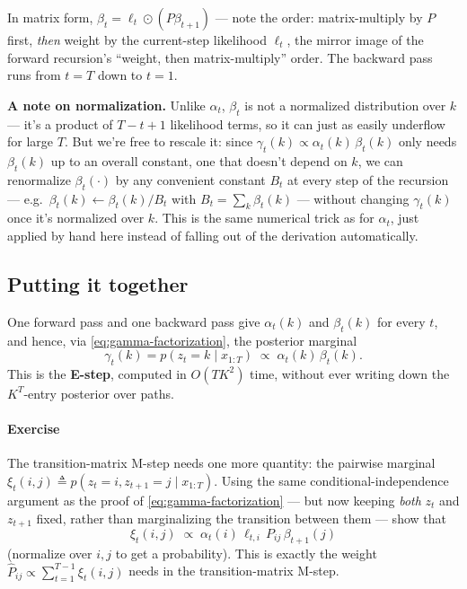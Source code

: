 \documentclass[11pt]{article}
\begin{document}
In matrix form, $\beta_t = \ell_t \odot (P\beta_{t+1})$ --- note the order:
matrix-multiply by $P$ first, \emph{then} weight by the current-step
likelihood $\ell_t$, the mirror image of the forward recursion's ``weight,
then matrix-multiply'' order. The backward pass runs from $t=T$ down to
$t=1$.

\textbf{A note on normalization.} Unlike $\alpha_t$, $\beta_t$ is not a
normalized distribution over $k$ --- it's a product of $T-t+1$ likelihood
terms, so it can just as easily underflow for large $T$. But we're free to
rescale it: since $\gamma_t(k) \propto \alpha_t(k)\,\beta_t(k)$
only needs $\beta_t(k)$ up to an overall constant, one that doesn't depend
on $k$, we can renormalize $\beta_t(\cdot)$ by any convenient constant
$B_t$ at every step of the recursion --- e.g.\ $\beta_t(k) \leftarrow
\beta_t(k)/B_t$ with $B_t = \sum_k \beta_t(k)$ --- without changing
$\gamma_t(k)$ once it's normalized over $k$. This is the same numerical
trick as for $\alpha_t$, just applied by hand here instead of falling out
of the derivation automatically.

\subsection{Putting it together}

One forward pass and one backward pass give $\alpha_t(k)$ and $\beta_t(k)$
for every $t$, and hence, via \eqref{eq:gamma-factorization}, the posterior
marginal
\begin{equation}
\gamma_t(k) = p(z_t{=}k \mid x_{1:T}) \;\propto\; \alpha_t(k)\, \beta_t(k).
\label{eq:posterior-marginal}
\end{equation}
This is the \textbf{E-step}, computed in $O(TK^2)$ time, without ever
writing down the $K^T$-entry posterior over paths.

\paragraph{Exercise} The transition-matrix M-step needs one more quantity:
the pairwise marginal $\xi_t(i,j) \triangleq p(z_t{=}i, z_{t+1}{=}j \mid
x_{1:T})$. Using the same conditional-independence argument as the proof
of \eqref{eq:gamma-factorization} --- but now keeping \emph{both} $z_t$ and
$z_{t+1}$ fixed, rather than marginalizing the transition between them ---
show that
\[
\xi_t(i,j) \;\propto\; \alpha_t(i)\, \ell_{t,i}\, P_{ij}\, \beta_{t+1}(j)
\]
(normalize over $i,j$ to get a probability). This
is exactly the weight $\hat P_{ij} \propto \sum_{t=1}^{T-1} \xi_t(i,j)$
needs in the transition-matrix M-step.




\end{document}
